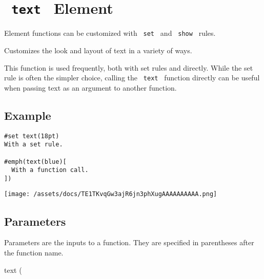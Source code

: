 \section{\texorpdfstring{\texttt{\ text\ } {{ Element
}}}{ text   Element }}\label{summary}

\label{element-tooltip}
Element functions can be customized with \texttt{\ set\ } and
\texttt{\ show\ } rules.

Customizes the look and layout of text in a variety of ways.

This function is used frequently, both with set rules and directly.
While the set rule is often the simpler choice, calling the
\texttt{\ text\ } function directly can be useful when passing text as
an argument to another function.

\subsection{Example}\label{example}

\begin{verbatim}
#set text(18pt)
With a set rule.

#emph(text(blue)[
  With a function call.
])
\end{verbatim}

\texttt{[image: /assets/docs/TE1TKvqGw3ajR6jn3phXugAAAAAAAAAA.png]}

\subsection{\texorpdfstring{{ Parameters
}}{ Parameters }}\label{parameters}

\label{parameters-tooltip}
Parameters are the inputs to a function. They are specified in
parentheses after the function name.

{ text } (

